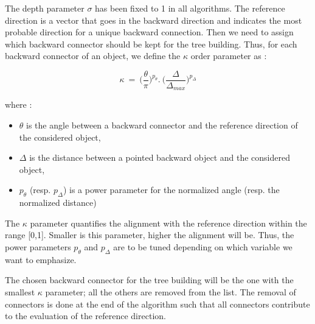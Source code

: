 \documentclass[cits]{JINST}
\begin{document}
The depth parameter $\sigma$ has been fixed to 1 in all algorithms. The reference direction is a vector that goes in the backward direction and indicates the most probable direction for a unique backward connection. Then we need to assign which backward connector should be kept for the tree building. Thus, for each backward connector of an object, we define the $\kappa$ order parameter as :

\begin{equation}
  \kappa~=~\Big(\frac{\theta}{\pi}\Big)^{p_{\theta}} . ~\Big(\frac{\Delta}{\Delta_{max}}\Big)^{p_{\Delta}} 
\end{equation}

where :

\begin{itemize}
  \item $\theta$ is the angle between a backward connector and the reference direction of the considered object,
  \item $\Delta$ is the distance between a pointed backward object and the considered object,
  \item $p_{\theta}$ (resp. $p_{\Delta}$) is a power parameter for the normalized angle (resp. the normalized distance)
\end{itemize}

The $\kappa$ parameter quantifies the alignment with the reference direction within the range [0,1]. Smaller is this parameter, higher the alignment will be. Thus, the power parameters $p_{\theta}$ and $p_{\Delta}$ are to be tuned depending on which variable we want to emphasize.

The chosen backward connector for the tree building will be the one with the smallest $\kappa$ parameter; all the others are removed from the list. The removal of connectors is done at the end of the algorithm such that all connectors contribute to the evaluation of the reference direction.
\end{document}
